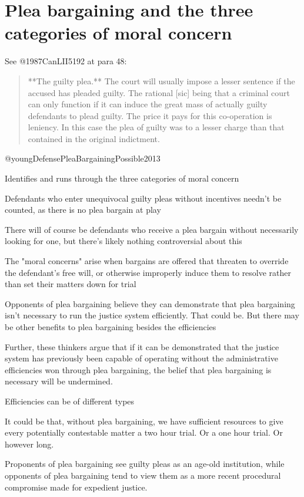 \section{Plea bargaining and the three categories of moral concern}



See @1987CanLII5192 at para 48:
\begin{quote}
    **The guilty plea.** The court will usually impose a lesser sentence if the accused has pleaded guilty. The rational [sic] being that a criminal court can only function if it can induce the great mass of actually guilty defendants to plead guilty. The price it pays for this co-operation is leniency. In this case the plea of guilty was to a lesser charge than that contained in the original indictment.
\end{quote}

@youngDefensePleaBargainingPossible2013

Identifies and runs through the three categories of moral concern

Defendants who enter unequivocal guilty pleas without incentives needn't be counted, as there is no plea bargain at play

There will of course be defendants who receive a plea bargain without necessarily looking for one, but there's likely nothing controversial about this

The "moral concerns" arise when bargains are offered that threaten to override the defendant's free will, or otherwise improperly induce them to resolve rather than set their matters down for trial

Opponents of plea bargaining believe they can demonstrate that plea bargaining isn't necessary to run the justice system efficiently. That could be. But there may be other benefits to plea bargaining besides the efficiencies

Further, these thinkers argue that if it can be demonstrated that the justice system has previously been capable of operating without the administrative efficiencies won through plea bargaining, the belief that plea bargaining is necessary will be undermined.

Efficiencies can be of different types

It could be that, without plea bargaining, we have sufficient resources to give every potentially contestable matter a two hour trial. Or a one hour trial. Or however long.

Proponents of plea bargaining see guilty pleas as an age-old institution, while opponents of plea bargaining tend to view them as a more recent procedural compromise made for expedient justice.

